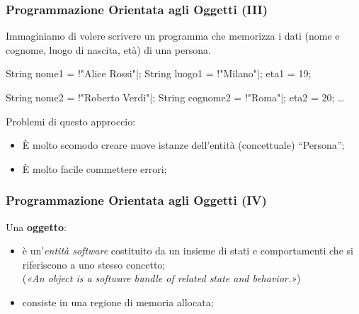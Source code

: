 \begin{frame}[fragile]\frametitle{Programmazione Orientata agli Oggetti (III)}
  
  Immaginiamo di volere scrivere un programma che memorizza i dati (nome e cognome,
  luogo di nascita, età) di una persona.
  \begin{JavaCodePlain}[commandchars=\\!|]
  
  String nome1 = \String!"Alice Rossi"|;
  String luogo1 = \String!"Milano"|;
  \Jint eta1 = 19;
  
  String nome2 = \String!"Roberto Verdi"|;
  String cognome2 = \String!"Roma"|;
  \Jint  eta2 = 20;
  \dots

  \end{JavaCodePlain}
  
  Problemi di questo approccio:
  \begin{itemize}
   \item   È molto scomodo creare nuove istanze dell'entità (concettuale) ``Persona'';
   \item   È molto facile commettere errori;
  \end{itemize}

\end{frame}

\begin{frame}[fragile]\frametitle{Programmazione Orientata agli Oggetti (IV)}

  Una \textbf{oggetto}:
  \begin{itemize}
    \item è un'\emph{entità software} costituito da un insieme di stati e comportamenti che si riferiscono a uno stesso concetto; \\
          {\footnotesize (\emph{«An object is a software bundle of related state and behavior.»}) }
          {\scriptsize {} }
    \item consiste in una regione di memoria allocata;

  \end{itemize}
\end{frame}

